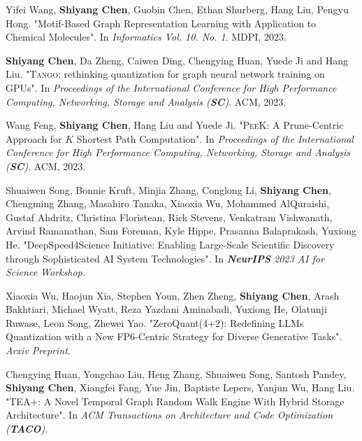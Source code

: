 \documentclass[12pt, a4paper]{article}
\newcommand{\years}[1]{\marginnote{#1}}
\begin{document}
\vspace*{2mm}

\years{2023} Yifei Wang, \textbf{Shiyang Chen}, Guobin Chen, Ethan Shurberg, Hang Liu, Pengyu Hong. "Motif-Based Graph Representation Learning with Application to Chemical Molecules". In \textit{Informatics Vol. 10. No. 1}. MDPI, 2023.

\vspace*{2mm}

\years{2023} \textbf{Shiyang Chen}, Da Zheng, Caiwen Ding, Chengying Huan, Yuede Ji and Hang Liu. "\textsc{Tango}: rethinking quantization for graph neural network training on GPUs". In \textit{Proceedings of the International Conference for High Performance Computing, Networking, Storage and Analysis (\textbf{SC})}. ACM, 2023. 

\vspace*{2mm}

\years{2023} Wang Feng, \textbf{Shiyang Chen}, Hang Liu and Yuede Ji. "\textsc{PeeK}: A Prune-Centric Approach for $K$ Shortest Path Computation". In \textit{Proceedings of the International Conference for High Performance Computing, Networking, Storage and Analysis (\textbf{SC})}. ACM, 2023. 



\vspace*{2mm}

\years{2023} Shuaiwen Song, Bonnie Kruft, Minjia Zhang, Conglong Li, \textbf{Shiyang Chen}, Chengming Zhang, Masahiro Tanaka, Xiaoxia Wu, Mohammed AlQuraishi, Gustaf Ahdritz, Christina Floristean, Rick Stevens, Venkatram Vishwanath, Arvind Ramanathan, Sam Foreman, Kyle Hippe, Prasanna Balaprakash, Yuxiong He. "DeepSpeed4Science Initiative: Enabling Large-Scale Scientific Discovery through Sophisticated AI System Technologies". In \textit{\textbf{NeurIPS} 2023 AI for Science Workshop.}  

\vspace*{2mm}

\years{2023} Xiaoxia Wu, Haojun Xia, Stephen Youn, Zhen Zheng, \textbf{Shiyang Chen}, Arash Bakhtiari, Michael Wyatt, Reza Yazdani Aminabadi, Yuxiong He, Olatunji Ruwase, Leon Song, Zhewei Yao.
"ZeroQuant(4+2): Redefining LLMs Quantization with a New FP6-Centric Strategy for Diverse Generative Tasks". \textit{Arxiv Preprint}.

\vspace*{2mm}

\years{2024}
Chengying Huan, Yongchao Liu, Heng Zhang, Shuaiwen Song, Santosh Pandey, \textbf{Shiyang Chen}, Xiangfei Fang, Yue Jin, Baptiste Lepers, Yanjun Wu, Hang Liu. "TEA+: A Novel Temporal Graph Random Walk Engine With Hybrid Storage Architecture". In \textit{ACM Transactions on Architecture and Code Optimization (\textbf{TACO})}.
\end{document}

